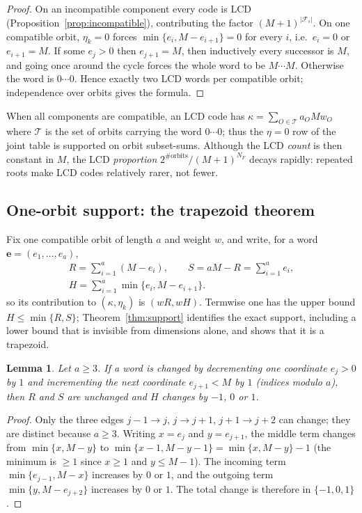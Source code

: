 \documentclass[preprint,12pt,a4paper]{elsarticle}
\newcommand{\Fs}{\mathcal F_s}
\newtheorem{lemma}[theorem]{Lemma}
\theoremstyle{definition}
\theoremstyle{remark}
\begin{document}
\begin{proof}
On an incompatible component every code is LCD
(Proposition~\ref{prop:incompatible}), contributing the factor
$(M+1)^{|\Fs|}$.  On one compatible orbit, $\eta_k=0$ forces
$\min\{e_i,M-e_{i+1}\}=0$ for every $i$, i.e.\ $e_i=0$ or $e_{i+1}=M$.
If some $e_j>0$ then $e_{j+1}=M$, then inductively every successor is $M$, and
going once around the cycle forces the whole word to be $M\cdots M$.
Otherwise the word is $0\cdots0$.  Hence exactly two LCD words per compatible
orbit; independence over orbits gives the formula.
\end{proof}

When all components are compatible, an LCD code has
$\kappa=\sum_{O\in\mathcal{T}}a_OMw_O$ where $\mathcal{T}$ is the set of orbits
carrying the word $0\cdots0$; thus the $\eta=0$ row of the joint table is
supported on orbit subset-sums.  Although the LCD \emph{count} is then constant
in $M$, the LCD \emph{proportion} $2^{\#\mathrm{orbits}}/(M+1)^{N_F}$ decays
rapidly: repeated roots make LCD codes relatively rarer, not fewer.

\subsection{One-orbit support: the trapezoid theorem}\label{sec:support}

Fix one compatible orbit of length $a$ and weight $w$, and write, for a word
$\mathbf{e}=(e_1,\ldots,e_a)$,
\[
\begin{gathered}
R=\sum_{i=1}^{a}(M-e_i),\qquad
S=aM-R=\sum_{i=1}^{a}e_i,\\[6pt]
H=\sum_{i=1}^{a}\min\{e_i,M-e_{i+1}\}.
\end{gathered}
\]
so its contribution to $(\kappa,\eta_k)$ is $(wR,wH)$.  Termwise one has the
upper bound $H\leq\min\{R,S\}$; Theorem~\ref{thm:support} identifies the
exact support, including a lower bound that is invisible from dimensions
alone, and shows that it is a trapezoid.

\begin{lemma}\label{lem:transfer-step}
Let $a\geq3$.  If a word is changed by decrementing one coordinate $e_j>0$ by
$1$ and incrementing the next coordinate $e_{j+1}<M$ by $1$ (indices modulo
$a$), then $R$ and $S$ are unchanged and $H$ changes by $-1$, $0$ or $1$.
\end{lemma}

\begin{proof}
Only the three edges $j-1\to j$, $j\to j+1$, $j+1\to j+2$ can change; they are
distinct because $a\geq3$.  Writing $x=e_j$ and $y=e_{j+1}$, the middle term
changes from $\min\{x,M-y\}$ to $\min\{x-1,M-y-1\}=\min\{x,M-y\}-1$ (the
minimum is $\geq1$ since $x\geq1$ and $y\leq M-1$).  The incoming term
$\min\{e_{j-1},M-x\}$ increases by $0$ or $1$, and the outgoing term
$\min\{y,M-e_{j+2}\}$ increases by $0$ or $1$.  The total change is therefore
in $\{-1,0,1\}$.
\end{proof}
\end{document}
